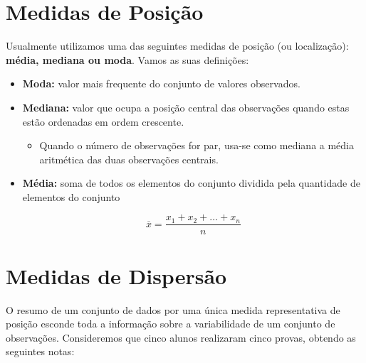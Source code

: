 \documentclass[
]{book}
\providecommand{\tightlist}{%
  \setlength{\itemsep}{0pt}\setlength{\parskip}{0pt}}
\begin{document}
\hypertarget{medidas-de-posiuxe7uxe3o}{%
\section{Medidas de Posição}\label{medidas-de-posiuxe7uxe3o}}

Usualmente utilizamos uma das seguintes medidas de posição (ou localização): \textbf{média, mediana ou moda}. Vamos as suas definições:

\begin{itemize}
\item
  \textbf{Moda:} valor mais frequente do conjunto de valores observados.
\item
  \textbf{Mediana:} valor que ocupa a posição central das observações quando estas estão ordenadas em ordem crescente.

  \begin{itemize}
  \tightlist
  \item
    Quando o número de observações for par, usa-se como mediana a média aritmética das duas observações centrais.
  \end{itemize}
\item
  \textbf{Média:} soma de todos os elementos do conjunto dividida pela quantidade de elementos do conjunto

  \[
  \overline{x} = \frac{x_1+x_2 + \dots + x_n}{n}
  \]
\end{itemize}

\hypertarget{medidas-de-dispersuxe3o}{%
\section{Medidas de Dispersão}\label{medidas-de-dispersuxe3o}}

O resumo de um conjunto de dados por uma única medida representativa de posição esconde toda a informação sobre a variabilidade de um conjunto de observações. Consideremos que cinco alunos realizaram cinco provas, obtendo as seguintes notas:
\end{document}
